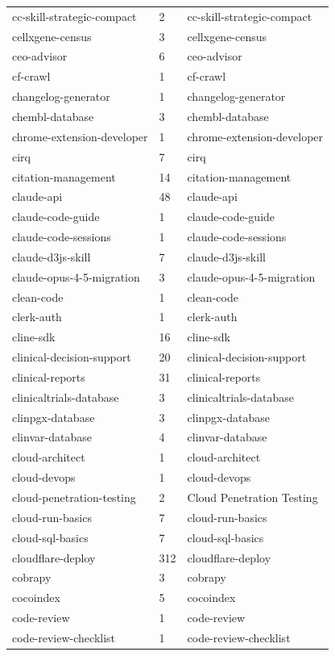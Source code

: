 \begin{longtable}{@{}lll@{}}
cc-skill-strategic-compact & 2 & cc-skill-strategic-compact\\
cellxgene-census & 3 & cellxgene-census\\
ceo-advisor & 6 & ceo-advisor\\
cf-crawl & 1 & cf-crawl\\
changelog-generator & 1 & changelog-generator\\
chembl-database & 3 & chembl-database\\
chrome-extension-developer & 1 & chrome-extension-developer\\
cirq & 7 & cirq\\
citation-management & 14 & citation-management\\
claude-api & 48 & claude-api\\
claude-code-guide & 1 & claude-code-guide\\
claude-code-sessions & 1 & claude-code-sessions\\
claude-d3js-skill & 7 & claude-d3js-skill\\
claude-opus-4-5-migration & 3 & claude-opus-4-5-migration\\
clean-code & 1 & clean-code\\
clerk-auth & 1 & clerk-auth\\
cline-sdk & 16 & cline-sdk\\
clinical-decision-support & 20 & clinical-decision-support\\
clinical-reports & 31 & clinical-reports\\
clinicaltrials-database & 3 & clinicaltrials-database\\
clinpgx-database & 3 & clinpgx-database\\
clinvar-database & 4 & clinvar-database\\
cloud-architect & 1 & cloud-architect\\
cloud-devops & 1 & cloud-devops\\
cloud-penetration-testing & 2 & Cloud Penetration Testing\\
cloud-run-basics & 7 & cloud-run-basics\\
cloud-sql-basics & 7 & cloud-sql-basics\\
cloudflare-deploy & 312 & cloudflare-deploy\\
cobrapy & 3 & cobrapy\\
cocoindex & 5 & cocoindex\\
code-review & 1 & code-review\\
code-review-checklist & 1 & code-review-checklist\\

\end{longtable}
